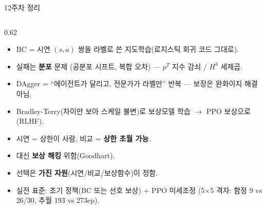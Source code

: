 \documentclass[aspectratio=169,11pt]{beamer}
\begin{document}
\begin{frame}{12주차 정리}
  \small
  \begin{columns}[T]
    \begin{column}{0.62\textwidth}
      \begin{itemize}
        \item BC = 시연 $(s,a)$ 쌍을 라벨로 쓴 지도학습(로지스틱
          회귀 코드 그대로).
        \item 실패는 \textbf{분포} 문제 (공분포 시프트, 복합 오차) —
          $p^T$ 지수 감쇠 / $H^3$ 세제곱.
        \item DAgger = ``에이전트가 달리고, 전문가가 라벨만'' 반복 —
          보장은 완화이지 해결 아님.
      \end{itemize}
      \begin{itemize}
        \item Bradley-Terry(차이만 보아 스케일 불변)로 보상모델
          학습 $\to$ PPO 보상으로(RLHF).
        \item 시연 = 상한이 사람, 비교 = \textbf{상한 초월 가능}.
        \item 대신 \textbf{보상 해킹} 위험(Goodhart).
      \end{itemize}
      \begin{itemize}
        \item 선택은 \textbf{가진 자원}(시연/비교/보상함수)이
          정함.
        \item 실전 표준: 초기 정책(BC 또는 선호 보상) + PPO
          미세조정 (5$\times$5 격자: 함정 9 vs 26/30, 추월
          193 vs 273ep).
      \end{itemize}
    \end{column}
  \end{columns}
\end{frame}
\end{document}
